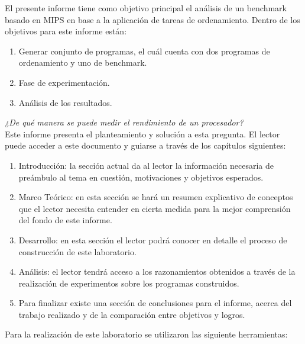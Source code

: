 \documentclass{memoria}
\begin{document}


\indices


El presente informe tiene como objetivo principal el análisis de un benchmark basado en MIPS en base a la aplicación de tareas de ordenamiento.
Dentro de los objetivos para este informe están:
\begin{enumerate}
\item Generar conjunto de programas, el cuál cuenta con dos programas de ordenamiento y uno de benchmark.
\item Fase de experimentación.
\item Análisis de los resultados.
\end{enumerate}
\emph{¿De qué manera se puede medir el rendimiento de un procesador?}\\Este informe presenta el planteamiento y solución a esta pregunta.
El lector puede acceder a este documento y guiarse a través de los capítulos siguientes:
\begin{enumerate}
\item Introducción: la sección actual da al lector la información necesaria de preámbulo al tema  en cuestión, motivaciones y objetivos esperados.
\item Marco Teórico: en esta sección se hará un resumen explicativo de conceptos que el lector necesita entender en cierta medida para la mejor comprensión del fondo de este informe.
\item Desarrollo: en esta sección el lector podrá conocer en detalle el proceso de construcción de este laboratorio.
\item Análisis: el lector tendrá acceso a los razonamientos obtenidos a través de la realización  de experimentos sobre los programas construidos.
\item Para finalizar existe una sección de conclusiones para el informe, acerca del trabajo realizado y de la comparación entre objetivos y logros.
\end{enumerate}
Para la realización de este laboratorio se utilizaron las siguiente herramientas:
\end{document}
